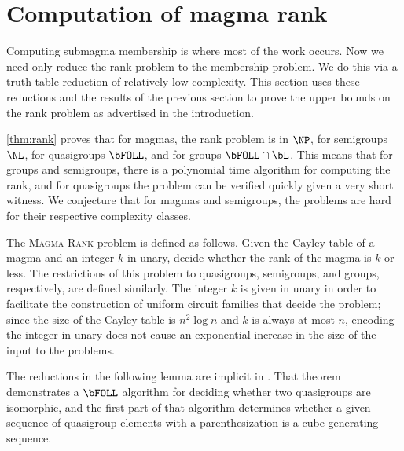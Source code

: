 \documentclass{article}
\begin{document}
\section{Computation of magma rank}

%
Computing submagma membership is where most of the work occurs.
Now we need only reduce the rank problem to the membership problem.
We do this via a truth-table reduction of relatively low complexity.
This section uses these reductions and the results of the previous section to prove the upper bounds on the rank problem as advertised in the introduction.

%
\autoref{thm:rank} proves that for magmas, the rank problem is in $\NP$, for semigroups $\NL$, for quasigroups $\bFOLL$, and for groups $\bFOLL \cap \bL$.
This means that for groups and semigroups, there is a polynomial time algorithm for computing the rank, and for quasigroups the problem can be verified quickly given a very short witness.
We conjecture that for magmas and semigroups, the problems are hard for their respective complexity classes.

The \textsc{Magma Rank} problem is defined as follows.
Given the Cayley table of a magma and an integer $k$ in unary, decide whether the rank of the magma is $k$ or less.
The restrictions of this problem to quasigroups, semigroups, and groups, respectively, are defined similarly.
The integer $k$ is given in unary in order to facilitate the construction of uniform circuit families that decide the problem; since the size of the Cayley table is $n^2 \log n$ and $k$ is always at most $n$, encoding the integer in unary does not cause an exponential increase in the size of the input to the problems.

The reductions in the following lemma are implicit in \autocite[Theorem~3.4]{ctw13}.
That theorem demonstrates a $\bFOLL$ algorithm for deciding whether two quasigroups are isomorphic, and the first part of that algorithm determines whether a given sequence of quasigroup elements with a parenthesization is a cube generating sequence.
\end{document}

